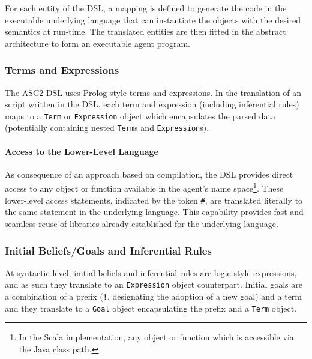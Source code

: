 For each entity of the DSL, a mapping is defined to generate the code in the executable underlying language that can instantiate the objects with the desired semantics at run-time. The translated entities are then fitted in the abstract architecture to form an executable agent program.

\subsubsection{Terms and Expressions}
The ASC2 DSL uses Prolog-style terms and expressions. In the translation of an script written in the DSL, each term and expression (including inferential rules) maps to a \verb+Term+ or \verb+Expression+ object which encapsulates the parsed data (potentially containing nested \verb+Term+s and \verb+Expression+s).

\paragraph{Access to the Lower-Level Language} As consequence of an approach based on compilation, the DSL provides direct access to any object or function available in the agent's name space\footnote{In the Scala implementation, any object or function which is accessible via the Java class path.}. These lower-level access statements, indicated by the token \verb+#+, are translated literally to the same statement in the underlying language. This capability provides fast and seamless reuse of libraries already established for the underlying language.


\subsubsection{Initial Beliefs/Goals and Inferential Rules}
At syntactic level, initial beliefs and inferential rules are logic-style expressions, and as such they translate to an \verb+Expression+ object counterpart. Initial goals are a combination of a prefix (\verb+!+, designating the adoption of a new goal)
and a term and they translate to a \verb+Goal+ object encapsulating the prefix and a \verb+Term+ object.

